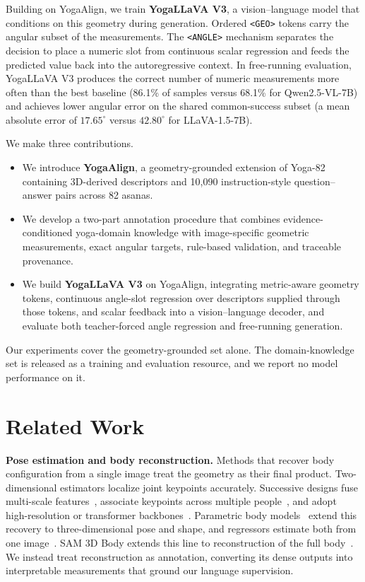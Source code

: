 \documentclass[conference]{IEEEtran}
\begin{document}
Building on YogaAlign, we train \textbf{YogaLLaVA V3}, a vision--language model that conditions on this geometry during generation.
Ordered \texttt{<GEO>} tokens carry the angular subset of the measurements.
The \texttt{<ANGLE>} mechanism separates the decision to place a numeric slot from continuous scalar regression and feeds the predicted value back into the autoregressive context.
In free-running evaluation, YogaLLaVA V3 produces the correct number of numeric measurements more often than the best baseline (86.1\% of samples versus 68.1\% for Qwen2.5-VL-7B) and achieves lower angular error on the shared common-success subset (a mean absolute error of $17.65^\circ$ versus $42.80^\circ$ for LLaVA-1.5-7B).

We make three contributions.
\begin{itemize}[leftmargin=1.2em,itemsep=2pt,topsep=3pt]
    \item We introduce \textbf{YogaAlign}, a geometry-grounded extension of Yoga-82 containing 3D-derived descriptors and 10,090 instruction-style question--answer pairs across 82 asanas.
    \item We develop a two-part annotation procedure that combines evidence-conditioned yoga-domain knowledge with image-specific geometric measurements, exact angular targets, rule-based validation, and traceable provenance.
    \item We build \textbf{YogaLLaVA V3} on YogaAlign, integrating metric-aware geometry tokens, continuous angle-slot regression over descriptors supplied through those tokens, and scalar feedback into a vision--language decoder, and evaluate both teacher-forced angle regression and free-running generation.
\end{itemize}
Our experiments cover the geometry-grounded set alone.
The domain-knowledge set is released as a training and evaluation resource, and we report no model performance on it.
\section{Related Work}
\label{sec:related}

\noindent\textbf{Pose estimation and body reconstruction.}
Methods that recover body configuration from a single image treat the geometry as their final product.
Two-dimensional estimators localize joint keypoints accurately.
Successive designs fuse multi-scale features~\cite{newell2016stacked,xiao2018simple}, associate keypoints across multiple people~\cite{cao2019openpose}, and adopt high-resolution or transformer backbones~\cite{sun2019deep,xu2022vitpose}.
Parametric body models~\cite{loper2015smpl} extend this recovery to three-dimensional pose and shape, and regressors estimate both from one image~\cite{kanazawa2018end,kolotouros2019spin,li2022cliff,goel2023humans}.
SAM 3D Body extends this line to reconstruction of the full body~\cite{yang2026sam3dbody}.
We instead treat reconstruction as annotation, converting its dense outputs into interpretable measurements that ground our language supervision.
\end{document}

